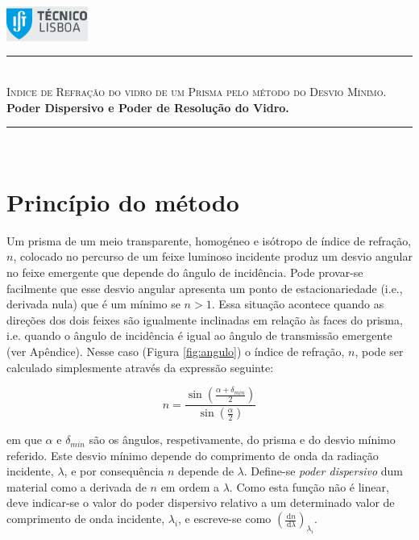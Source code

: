 \documentclass[a4paper,12pt]{article}  %
\author{Prof. Bernardo B. Carvalho}
\date{ Outubro 2012}
\newcommand{\ud}{\,\mathrm{d}}
\newcommand{\HRule}{\rule{\linewidth}{0.5mm}}
\begin{document}
 

	\includegraphics[width=0.2\textwidth]{../logo-ist}%

	\HRule \\[0.5cm]
	{ \huge \sf  \textsc{Indice de Refração do vidro de um Prisma pelo método  do Desvio Mínimo.}} \\[0.4cm] %
	{ \large \bfseries Poder Dispersivo e Poder de Resolução do Vidro.}\\
	\HRule \\%

\section{\sf Princípio do método}
Um prisma de um meio transparente, homogéneo e isótropo de índice de refração, $n$, colocado no percurso de um feixe luminoso incidente produz um desvio angular no feixe emergente que depende do ângulo de incidência. Pode provar-se facilmente que esse desvio angular apresenta um ponto de estacionariedade (i.e., derivada nula) que é um mínimo se $n > 1$. 
Essa situação acontece quando as direções dos dois feixes são igualmente inclinadas em relação às faces do prisma, i.e. quando o ângulo de incidência é igual ao ângulo de transmissão 
emergente (ver Apêndice). 
Nesse caso  (Figura \ref{fig:angulo}) o índice de refração, $n$, pode ser calculado simplesmente através da expressão seguinte: 

\begin{equation}
	\label{eq:desviomim}
	n= \frac{\sin \left( \frac{\alpha+ \delta_{min}}{2} \right) } {\sin \left(  \frac{\alpha}{2} \right)}  
\end{equation}

em que $\alpha$ e  $\delta_{min}$ são os ângulos, respetivamente, do prisma e do desvio mínimo referido. Este desvio mínimo depende do comprimento de onda da radiação incidente, $\lambda$, e por consequência $n$ depende de $\lambda$. Define-se \emph{poder dispersivo} dum material como a derivada de $n$ em ordem a $\lambda$. Como esta função não é linear, deve indicar-se o valor do poder dispersivo relativo a um determinado valor de comprimento de onda incidente,  $\lambda_i$,  e escreve-se  como $\left( \frac{\ud n}{\ud \lambda } \right)_{\lambda_i}$.
\end{document}
